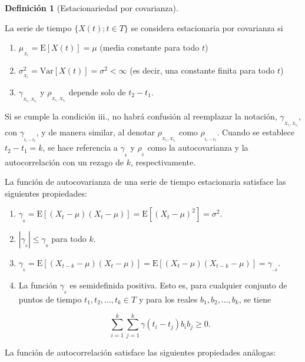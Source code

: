 \documentclass[
  us-letterpaper,
]{scrreprt}
\theoremstyle{definition}
\theoremstyle{plain}
\theoremstyle{plain}
\theoremstyle{definition}
\newtheorem{definition}{Definición}[chapter]
\theoremstyle{remark}
\begin{document}
\begin{definition}[Estacionariedad por
covarianza]\protect\hypertarget{def-estcov}{}\label{def-estcov}

La serie de tiempo \(\{X(t); t \in T\}\) se considera estacionaria por
covarianza si

\begin{enumerate}
\def\labelenumi{\roman{enumi}.}
\item
  \(\mu_{_{X_t}}=\mathrm E[X(t)] = \mu\) (media constante para todo
  \(t\))
\item
  \(\sigma^2_{_{X_t}}=\mathrm{Var}[X(t)] = \sigma^2 < \infty\) (es
  decir, una constante finita para todo \(t\))
\item
  \(\gamma_{_{X_{t_1},X_{t_2}}}\) y \(\rho_{_{X_{t_1},X_{t_2}}}\)
  depende solo de \(t_2 − t_1\).
\end{enumerate}

\end{definition}

Si se cumple la condición iii., no habrá confusión al reemplazar la
notación, \(\gamma_{_{X_{t_1},X_{t_2}}}\), con \(\gamma_{_{t_1-t_2}}\),
y de manera similar, al denotar \(\rho_{_{X_{t_1},X_{t_2}}}\) como
\(\rho_{_{t_1-t_2}}\). Cuando se establece \(t_2-t_1=k\), se hace
referencia a \(\gamma_{_k}\) y \(\rho_{_k}\) como la autocovarianza y la
autocorrelación con un rezago de \(k\), respectivamente.

La función de autocovarianza de una serie de tiempo estacionaria
satisface las siguientes propiedades:

\begin{enumerate}
\def\labelenumi{\roman{enumi}.}
\item
  \(\gamma_{_0}=\mathrm E[(X_{t}-\mu)(X_{t}-\mu)]=\mathrm E[(X_{t}-\mu)^2]=\sigma^2\).
\item
  \(|\gamma_{_k}|\leq \gamma_{_0}\) para todo \(k\).
\item
  \(\gamma_{_k}=\mathrm{E}[(X_{t-k}-\mu)(X_t-\mu)]=\mathrm{E}[(X_t-\mu)(X_{t-k}-\mu)]=\gamma_{_{-k}}\).
\item
  La función \(\gamma_{_k}\) es semidefinida positiva. Esto es, para
  cualquier conjunto de puntos de tiempo \(t_1, t_2,\ldots,t_k\in T\) y
  para los reales \(b_1,b_2,\ldots, b_k\), se tiene

  \[\sum_{i=1}^k \sum_{j=1}^k \gamma(t_i-t_j)b_i b_j\geq 0.
  \]
\end{enumerate}

La función de autocorrelación satisface las siguientes propiedades
análogas:
\end{document}
